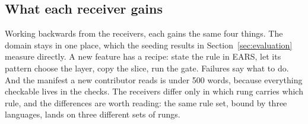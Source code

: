 \subsection{What each receiver gains}

Working backwards from the receivers, each gains the same four things. The domain stays in one
place, which the seeding results in Section~\ref{sec:evaluation} measure directly. A new feature
has a recipe: state the rule in EARS, let its pattern choose the layer, copy the slice, run the
gate. Failures say what to do. And the manifest a new contributor reads is under 500 words,
because everything checkable lives in the checks. The receivers differ only in which rung
carries which rule, and the differences are worth reading: the same rule set, bound by three
languages, lands on three different sets of rungs.
